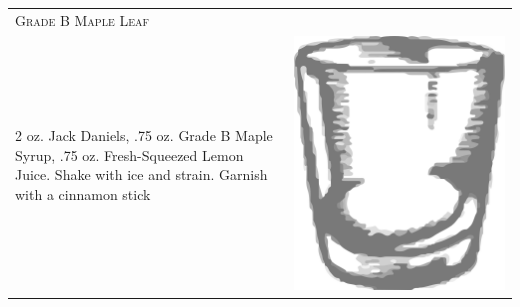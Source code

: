 \documentclass{article}
\begin{document}
\begin{tabular}{p{2in} p{0.5in}}
  \multicolumn{2}{p{3in}}{\centering\Huge\textsc{Grade B Maple Leaf}} \\ 
  
   \vspace{-0.1in}2 oz. Jack Daniels, .75 oz. Grade B Maple Syrup, .75
    oz. Fresh-Squeezed Lemon Juice. Shake with ice and strain.  Garnish with
    a cinnamon stick &  \vspace{-0.1in} \includegraphics{rocks_glass.png}
\end{tabular}
\end{document}
